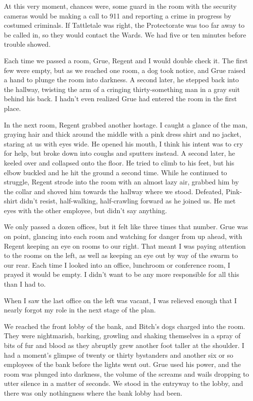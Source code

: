 At this very moment, chances were, some guard in the room with the security cameras would be making a call to 911 and reporting a crime in progress by costumed criminals.  If Tattletale was right, the Protectorate was too far away to be called in, so they would contact the Wards.  We had five or ten minutes before trouble showed.



Each time we passed a room, Grue, Regent and I would double check it.  The first few were empty, but as we reached one room, a dog took notice, and Grue raised a hand to plunge the room into darkness.  A second later, he stepped back into the hallway, twisting the arm of a cringing thirty-something man in a gray suit behind his back.  I hadn't even realized Grue had entered the room in the first place.



In the next room, Regent grabbed another hostage.  I caught a glance of the man, graying hair and thick around the middle with a pink dress shirt and no jacket, staring at us with eyes wide.  He opened his mouth, I think his intent was to cry for help, but broke down into coughs and sputters instead.  A second later, he keeled over and collapsed onto the floor.  He tried to climb to his feet, but his elbow buckled and he hit the ground a second time.  While he continued to struggle, Regent strode into the room with an almost lazy air, grabbed him by the collar and shoved him towards the hallway where we stood.  Defeated, Pink-shirt didn't resist, half-walking, half-crawling forward as he joined us.  He met eyes with the other employee, but didn't say anything.



We only passed a dozen offices, but it felt like three times that number.  Grue was on point, glancing into each room and watching for danger from up ahead, with Regent keeping an eye on rooms to our right.  That meant I was paying attention to the rooms on the left, as well as keeping an eye out by way of the swarm to our rear.  Each time I looked into an office, lunchroom or conference room, I prayed it would be empty.  I didn't want to be any more responsible for all this than I had to.



When I saw the last office on the left was vacant, I was relieved enough that I nearly forgot my role in the next stage of the plan.



We reached the front lobby of the bank, and Bitch's dogs charged into the room.  They were nightmarish, barking, growling and shaking themselves in a spray of bits of fur and blood as they abruptly grew another foot taller at the shoulder.  I had a moment's glimpse of twenty or thirty bystanders and another six or so employees of the bank before the lights went out.  Grue used his power, and the room was plunged into darkness, the volume of the screams and wails dropping to utter silence in a matter of seconds.  We stood in the entryway to the lobby, and there was only nothingness where the bank lobby had been.



